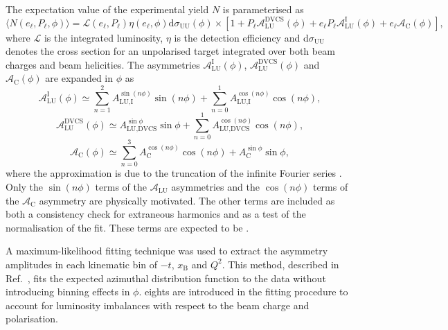 The expectation value of the experimental yield $N$ is parameterised as
\begin{equation}
 \langle N(e_{\ell},P_{\ell},\phi)\rangle =
\mathcal{L}(e_{\ell},P_{\ell})\eta(e_{\ell},\phi)\textrm{d}\sigma_{\textrm{UU}}
(\phi)\times
[1+P_{\ell}\mathcal{A}_{\textrm{LU}}^{\textrm{DVCS}}(\phi)+e_{\ell}P_{\ell}
\mathcal{A}_{\textrm{LU}}^{\textrm{I}}(\phi)+e_{\ell}\mathcal{A}_{\textrm{C}}
(\phi)],
\end{equation}
where $\mathcal{L}$ is the integrated luminosity, $\eta$ is the detection
efficiency and d$\sigma_{\textrm{UU}}$ denotes the
cross section for an unpolarised target integrated over both beam charges and
beam helicities. The asymmetries $\mathcal{A}_{\textrm{LU}}^{\textrm{I}}(\phi)$,
$\mathcal{A}_{\textrm{LU}}^{\textrm{DVCS}}(\phi)$ and
$\mathcal{A}_{\textrm{C}}(\phi)$ are expanded in
$\phi$ as
\begin{equation}
\mathcal{A}_{\textrm{LU}}^{\textrm{I}}(\phi) \simeq \sum^{2}_{n=1}
A_{\textrm{LU,I}}^{\sin(n\phi)}\sin(n\phi) 
+ \sum^{1}_{n=0} A_{\textrm{LU,I}}^{\cos(n\phi)}\cos(n\phi), 
\label{alui_asym}
\end{equation}
\begin{equation}
 \mathcal{A}_{\textrm{LU}}^{\textrm{DVCS}}(\phi) \simeq 
A_{\textrm{LU,DVCS}}^{\sin\phi}\sin\phi 
+ \sum^{1}_{n=0} A_{\textrm{LU,DVCS}}^{\cos(n\phi)}\cos(n\phi), 
\label{aludvcs_asym}
\end{equation}
\begin{equation}
\mathcal{A}_{\textrm{C}}(\phi) \simeq \sum^{3}_{n=0}
A_{\textrm{C}}^{\cos(n\phi)}\cos(n\phi) 
+ A_{\textrm{C}}^{\sin\phi}\sin\phi,
\label{ac_asym}
\end{equation}
where the approximation is due to the truncation of the infinite
Fourier series . Only the $\sin(n\phi)$ terms of the
$\mathcal{A}_{\textrm{LU}}$ asymmetries and the $\cos(n\phi)$ terms of the
$\mathcal{A}_{\textrm{C}}$ asymmetry are physically motivated. The other terms
are included as both a consistency check for 
extraneous harmonics  and as a test of the
normalisation of the fit. These terms are expected to be
.

A maximum-likelihood fitting technique \cite{Bar90} was used to
extract the asymmetry amplitudes in each kinematic bin of $-t$, $x_{\textrm{B}}$ and $Q^{2}$.
This method, described in Ref.~\cite{Air08}, fits the expected
azimuthal distribution function to the data without introducing binning effects in $\phi$.
eights are introduced in the fitting procedure to account for
luminosity imbalances with respect to the beam charge and polarisation.

